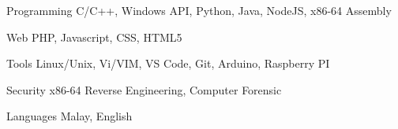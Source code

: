 

\begin{cvskills}

  \cvskill
    {Programming} %
    {C/C++, Windows API, Python, Java, NodeJS, x86-64 Assembly} %

  \cvskill
    {Web} %
    {PHP, Javascript, CSS, HTML5} %

  \cvskill
    {Tools} %
    {Linux/Unix, Vi/VIM, VS Code, Git, Arduino, Raspberry PI} %

  \cvskill
    {Security} %
    {x86-64 Reverse Engineering, Computer Forensic} %

  \cvskill
    {Languages} %
    {Malay, English} %

\end{cvskills}
